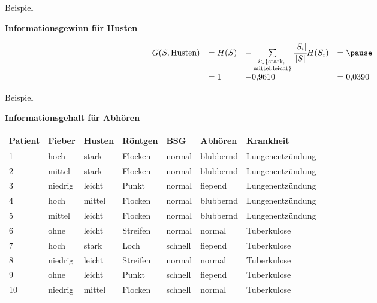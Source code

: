 \begin{frame}{Beispiel}

\textbf{Informationsgewinn für Husten}

\[
\begin{array}{r l l l}
    G(S, \text{Husten}) &= H(S) &- \sum\limits_{\substack{i \in \{\text{stark, } \\ \text{mittel,leicht}\}}} \cfrac{|S_i|}{|S|}H(S_i) &= \pause \\[1em]
    &= 1 &-0{,}9610 &= 0{,}0390 
\end{array}
\]

\end{frame}





\begin{frame}{Beispiel}

\textbf{Informationsgehalt für Abhören} \\[1em]

\begin{tabular}{|l l l l l l | l |}\hline
\textbf{Patient} & \textbf{\textcolor{ohmred}{Fieber}} & \textbf{\textcolor{ohmred}{Husten}} & \textbf{\textcolor{ohmred}{Röntgen}} & \textbf{\textcolor{ohmred}{BSG}} & \textbf{\textcolor{ohmred}{Abhören}} &\textbf{\textcolor{ohmgreen}{Krankheit}}\\ \hline
1 & hoch & stark & Flocken & normal & blubbernd & Lungenentzündung \\
2 & mittel & stark & Flocken & normal & blubbernd & Lungenentzündung \\
3 & niedrig & leicht & Punkt & normal & fiepend & Lungenentzündung \\
4 & hoch & mittel & Flocken & normal & blubbernd & Lungenentzündung \\
5 & mittel & leicht & Flocken & normal & blubbernd & Lungenentzündung \\
6 & ohne & leicht & Streifen & normal & normal & Tuberkulose \\
7 & hoch & stark & Loch & schnell & fiepend & Tuberkulose \\
8 & niedrig & leicht & Streifen & normal & normal & Tuberkulose \\
9 & ohne & leicht & Punkt & schnell & fiepend & Tuberkulose \\
10 & niedrig & mittel & Flocken & schnell & normal & Tuberkulose \\ \hline 
\end{tabular}

\vfill


\end{frame}
